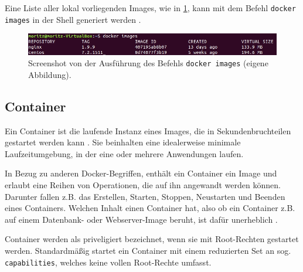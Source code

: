 \documentclass[../main.tex]{subfiles}
\begin{document}
			Eine Liste aller lokal vorliegenden Images, wie in \fig \ref{fig:intro_dockerImages}, kann mit dem Befehl \texttt{docker images} in der Shell generiert werden \cite{dockerImages}.

			\begin{figure}[!htbp]
          \centering
          \includegraphics[width=1.0\textwidth]{./images/intro_dockerImages.jpg}
          \caption{Screenshot von der Ausführung des Befehls \texttt{docker images} (eigene Abbildung).}
          \label{fig:intro_dockerImages}
      \end{figure}


    \subsection{Container}
		\label{dockerContainer}
			Ein Container ist die laufende Instanz eines Images, die in Sekundenbruchteilen gestartet werden kann \cite[S.1]{dockerIntroIEEE}. Sie beinhalten eine idealerweise minimale Laufzeitumgebung, in der eine oder mehrere Anwendungen laufen.

      In Bezug zu anderen Docker-Begriffen, enthält ein Container ein Image und erlaubt eine Reihen von Operationen, die auf ihn angewandt werden können. Darunter fallen z.B. das Erstellen, Starten, Stoppen, Neustarten und Beenden eines Containers. Welchen Inhalt einen Container hat, also ob ein Container z.B. auf einem Datenbank- oder Webserver-Image beruht, ist dafür unerheblich \cite[S.12]{dockerBook}\cite[S.2]{dockerLXCKub}.

      Container werden als priveligiert bezeichnet, wenn sie mit Root-Rechten gestartet werden. Standardmäßig startet ein Container mit einem reduzierten Set an sog. \texttt{capabilities}, welches keine vollen Root-Rechte umfasst.


\end{document}

